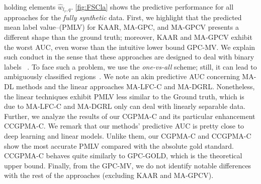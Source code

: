 \documentclass[journal]{IEEEtran}
\begin{document}
holding elements $\hat{w}_{l_r,q}$. \cref{fig:FSCla} shows the predictive performance for all approaches for the \textit{fully synthetic} data. First, we highlight that the predicted mean label value--(PMLV) for KAAR, MA-GPC, and MA-GPCV presents a different shape than the ground truth; moreover, KAAR and MA-GPCV exhibit the worst AUC, even worse than the intuitive lower bound GPC-MV. We explain such conduct in the sense that these approaches are designed to deal with binary labels ~\cite{gil2018learning,rodrigues2014gaussian,ruiz2019learning}. To face such a problem, we use the \textit{one-vs-all} scheme; still, it can lead to ambiguously classified regions~\cite{bishop2006pattern}. We note an akin predictive AUC concerning MA-DL methods and the linear approaches MA-LFC-C and MA-DGRL. Nonetheless, the linear techniques exhibit PMLV less similar to the Ground truth, which is due to MA-LFC-C and MA-DGRL only can deal with linearly separable data. Further, we analyze the results of our CGPMA-C and its particular enhancement CCGPMA-C. We remark that our methods' predictive AUC is pretty close to deep learning and linear models. Unlike them, our CGPMA-C and CCGPMA-C show the most accurate PMLV compared with the absolute gold standard. CCGPMA-C behaves quite similarly to GPC-GOLD, which is the theoretical upper bound. Finally, from the GPC-MV, we do not identify notable differences with the rest of the approaches (excluding KAAR and MA-GPCV).
\end{document}
